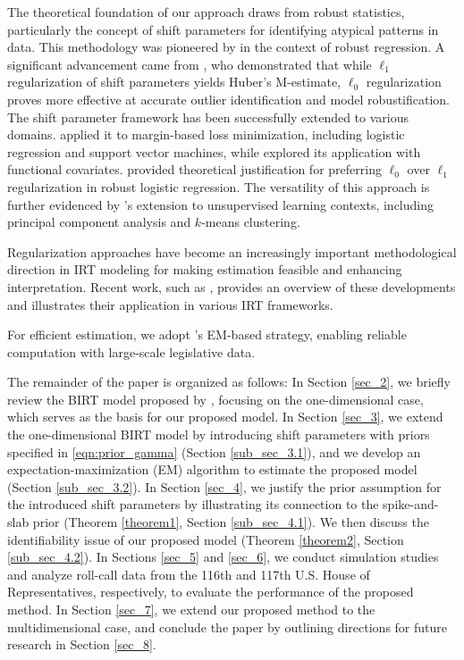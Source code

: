 \documentclass[11pt]{article}
\begin{document}
The theoretical foundation of our approach draws from robust statistics, particularly the concept of shift parameters for identifying atypical patterns in data. This methodology was pioneered by \cite{mccann2007} in the context of robust regression. A significant advancement came from \cite{she2011}, who demonstrated that while $\ell_1$ regularization of shift parameters yields Huber's M-estimate, $\ell_0$ regularization proves more effective at accurate outlier identification and model robustification. The shift parameter framework has been successfully extended to various domains. \cite{lee2012} applied it to margin-based loss minimization, including logistic regression and support vector machines, while \cite{lee2016} explored its application with functional covariates. \cite{shin2023} provided theoretical justification for preferring $\ell_0$ over $\ell_1$ regularization in robust logistic regression. The versatility of this approach is further evidenced by \cite{witten2013}'s extension to unsupervised learning contexts, including principal component analysis and $k$-means clustering. 

Regularization approaches have become an increasingly important methodological direction in IRT modeling for making estimation feasible and enhancing interpretation. Recent work, such as \cite{robitzsch2024smooth}, provides an overview of these developments and illustrates their application in various IRT frameworks.

For efficient estimation, we adopt \cite{Imai2016}'s EM-based strategy, enabling reliable computation with large-scale legislative data.



The remainder of the paper is organized as follows: In Section \ref{sec_2}, we briefly review the BIRT model proposed by \cite{Clinton2004}, focusing on the one-dimensional case, which serves as the basis for our proposed model. In Section \ref{sec_3}, we extend the one-dimensional BIRT model by introducing shift parameters with priors specified in \eqref{eqn:prior_gamma}  (Section \ref{sub_sec_3.1}), and we develop an expectation-maximization (EM) algorithm to estimate the proposed model (Section \ref{sub_sec_3.2}). In Section \ref{sec_4}, we justify the prior assumption for the introduced shift parameters by illustrating its connection to the spike-and-slab prior (Theorem \ref{theorem1}, Section \ref{sub_sec_4.1}). We then discuss the identifiability issue of our proposed model (Theorem \ref{theorem2}, Section \ref{sub_sec_4.2}). In Sections \ref{sec_5} and \ref{sec_6}, we conduct simulation studies and analyze roll-call data from the 116th and 117th U.S. House of Representatives, respectively, to evaluate the performance of the proposed method. In Section \ref{sec_7}, we extend our proposed method to the multidimensional case, and conclude the paper by outlining directions for future research in Section \ref{sec_8}.
\end{document}
